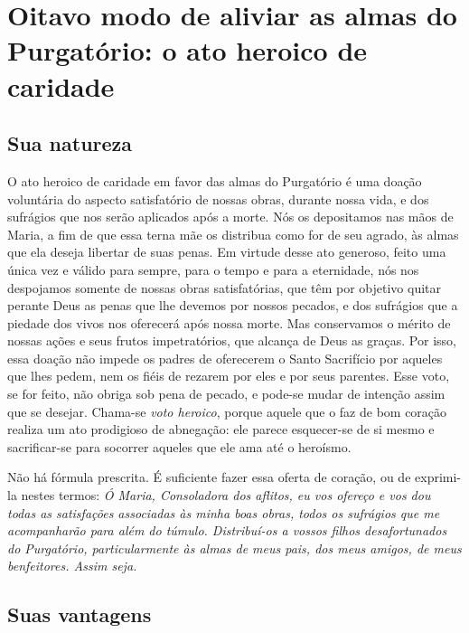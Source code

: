 \renewcommand{\thechapterdisplay}{Vigésimo sétimo dia}
\renewcommand{\thechapterrunner}{Oitavo modo: o ato heroico de caridade}
\chapter[Vigésimo sétimo dia --- Oitavo modo de aliviar as almas do Purgatório: o ato heroico de caridade]{Oitavo modo de aliviar as almas do Purgatório: o ato heroico de caridade}
\section*{Sua natureza}

O ato heroico de caridade em favor das almas do Purgatório é uma doação voluntária do aspecto satisfatório de nossas obras, durante nossa vida, e dos sufrágios que nos serão aplicados após a morte. Nós os depositamos nas mãos de Maria, a fim de que essa terna mãe os distribua como for de seu agrado, às almas que ela deseja libertar de suas penas. Em virtude desse ato generoso, feito uma única vez e válido para sempre, para o tempo e para a eternidade, nós nos despojamos somente de nossas obras satisfatórias, que têm por objetivo quitar perante Deus as penas que lhe devemos por nossos pecados, e dos sufrágios que a piedade dos vivos nos oferecerá após nossa morte. Mas conservamos o mérito de nossas ações e seus frutos impetratórios, que alcança de Deus as graças. Por isso, essa doação não impede os padres de oferecerem o Santo Sacrifício por aqueles que lhes pedem, nem os fiéis de rezarem por eles e por seus parentes. Esse voto, se for feito, não obriga sob pena de pecado, e pode-se mudar de intenção assim que se desejar. Chama-se \textit{voto heroico}, porque aquele que o faz de bom coração realiza um ato prodigioso de abnegação: ele parece esquecer-se de si mesmo e sacrificar-se para socorrer aqueles que ele ama até o heroísmo.

Não há fórmula prescrita. É suficiente fazer essa oferta de coração, ou de exprimi-la nestes termos: \textit{Ó Maria, Consoladora dos aflitos, eu vos ofereço e vos dou todas as satisfações associadas às minha boas obras, todos os sufrágios que me acompanharão para além do túmulo. Distribuí-os a vossos filhos desafortunados do Purgatório, particularmente às almas de meus pais, dos meus amigos, de meus benfeitores. Assim seja.}


\section*{Suas vantagens}


